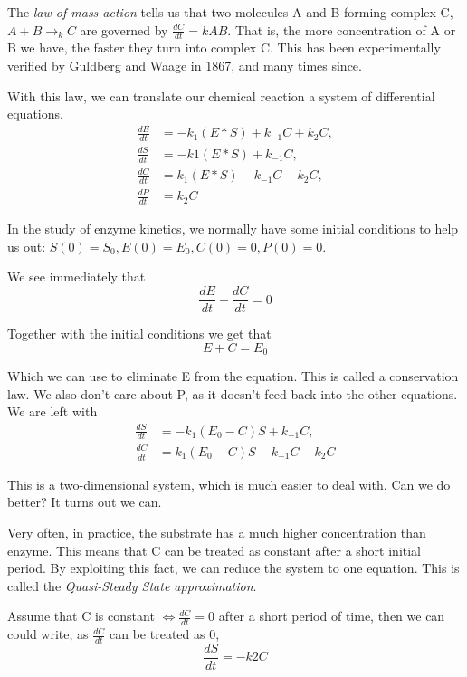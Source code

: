 \documentclass[12pt]{article}
\begin{document}
The \textit{law of mass action} tells us that two molecules A and B forming
complex C, $A+B \rightarrow_k C$ are governed by $\frac{dC}{dt} = kAB$. That is,
the more concentration of A or B we have, the faster they turn into complex C.
This has been experimentally verified by Guldberg and Waage in 1867, and many
times since.

With this law, we can translate our chemical reaction a system of differential
equations.
\begin{align}
\frac{dE}{dt} &= -k_1(E*S) + k_{-1}C + k_2C, \\
\frac{dS}{dt} &= -k1(E*S) + k_{-1}C, \\
\frac{dC}{dt} &= k_1(E*S) - k_{-1}C - k_2C, \\
\frac{dP}{dt} &= k_2C
\end{align}

In the study of enzyme kinetics, we normally have some initial conditions to help
us out: $S(0) = S_0, E(0) = E_0, C(0)=0, P(0)=0$.

We see immediately that
\begin{equation}
\frac{dE}{dt} + \frac{dC}{dt} = 0
\end{equation}

Together with the initial conditions we get that
\begin{equation}
E + C = E_0
\end{equation}

Which we can use to eliminate E from the equation. This is called a conservation
law.  We also don't care about P, as it doesn't feed back into the other
equations. We are left with
\begin{align}
\frac{dS}{dt} &= -k_1(E_0 - C)S + k_{-1}C, \\
\frac{dC}{dt} &= k_1(E_0 - C)S - k_{-1}C - k_2 C
\end{align}

This is a two-dimensional system, which is much easier to deal with. Can we do
better? It turns out we can.

Very often, in practice, the substrate has a much higher concentration than enzyme. This
means that C can be treated as constant after a short initial period. By
exploiting this fact, we can reduce the system to one equation. This is called
the \textit{Quasi-Steady State approximation}.

Assume that C is constant $\iff \frac{dC}{dt} = 0$ after a short period of time,
then we can could write, as $\frac{dC}{dt}$ can be treated as 0,
\begin{equation}
\frac{dS}{dt} = -k2 C
\end{equation}
\end{document}
